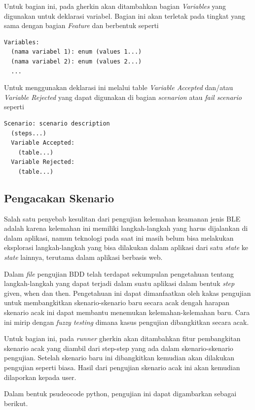 Untuk bagian ini, pada gherkin akan ditambahkan bagian \emph{Variables} yang digunakan
untuk deklarasi variabel. Bagian ini akan terletak pada tingkat yang sama dengan bagian \emph{Feature}
dan berbentuk seperti

\begin{lstlisting}[language=gherkin]
Variables:
  (nama variabel 1): enum (values 1...)
  (nama variabel 2): enum (values 2...)
  ...
\end{lstlisting}

Untuk menggunakan deklarasi ini melalui table \emph{Variable Accepted} dan/atau \emph{Variable Rejected}
yang dapat digunakan di bagian \emph{scenarion} atau \emph{fail scenario} seperti

\begin{lstlisting}[language=gherkin]
Scenario: scenario description
  (steps...)
  Variable Accepted:
    (table...)
  Variable Rejected:
    (table...)
\end{lstlisting}

\subsection{Pengacakan Skenario}
\label{sec:323}

Salah satu penyebab kesulitan dari pengujian kelemahan keamanan jenis BLE adalah karena kelemahan
ini memiliki langkah-langkah yang harus dijalankan di dalam aplikasi, namun teknologi pada saat
ini masih belum bisa melakukan eksplorasi langkah-langkah yang bisa dilakukan dalam aplikasi
dari satu \emph{state} ke \emph{state} lainnya, terutama dalam aplikasi berbasis web.

Dalam \emph{file} pengujian BDD telah terdapat sekumpulan pengetahuan tentang langkah-langkah
yang dapat terjadi dalam suatu aplikasi dalam bentuk \emph{step} given, when dan then.
Pengetahuan ini dapat dimanfaatkan oleh kakas pengujian untuk membangkitkan skenario-skenario
baru secara acak dengah harapan skenario acak ini dapat membantu menemukan kelemahan-kelemahan baru.
Cara ini mirip dengan \emph{fuzzy testing} dimana kasus pengujian dibangkitkan secara acak.

Untuk bagian ini, pada \textit{runner} gherkin akan ditambahkan fitur pembangkitan skenario acak
yang diambil dari step-step yang ada dalam skenario-skenario pengujian. Setelah skenario baru ini
dibangkitkan kemudian akan dilakukan pengujian seperti biasa. Hasil dari pengujian skenario acak
ini akan kemudian dilaporkan kepada user.

Dalam bentuk psudeocode python, pengujian ini dapat digambarkan sebagai berikut.


